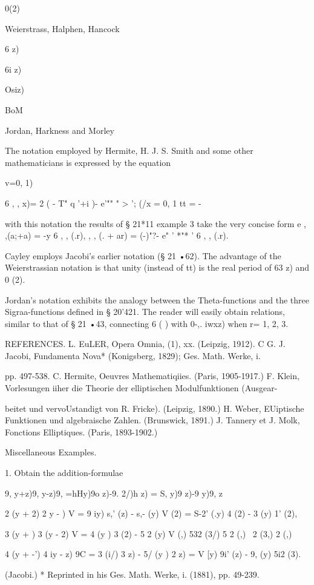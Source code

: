  0(2)

Weierstrass, Halphen, Hancock

6 z)

6i z)

Osiz)

BoM

Jordan, Harkness and Morley

The notation employed by Hermite, H. J. S. Smith and some other
mathematicians is expressed by the equation

v=0, 1)

6 , , x)= 2 ( - T" q '+i )- e'"" " > '; (/x = 0, 1 tt = -

with this notation the results of § 21*11 example 3 take the very
concise form e , ,(a;+a) = -y 6 , , (.r), , , (. + ar) = (-)"?- e" '
*"* ' 6 , , (.r).

Cayley employs Jacobi's earlier notation (§ 21 •62). The advantage of
the Weierstrassian notation is that unity (instead of tt) is the real
period of 63 z) and 0 (2).

Jordan's notation exhibits the analogy between the Theta-functions and
the three Sigraa-functions defined in § 20'421. The reader will easily
obtain relations, similar to that of § 21 •43, connecting 6 ( ) with
0-,. iwxz) when r= 1, 2, 3.

REFERENCES. L. EuLER, Opera Omnia, (1), xx. (Leipzig, 1912). C G. J.
Jacobi, Fundamenta Nova* (Konigsberg, 1829); Ges. Math. Werke, i.

pp. 497-538. C. Hermite, Oeuvres Mathematiqiies. (Paris, 1905-1917.)
F. Klein, Vorlesungen iiher die Theorie der elliptischen
Modulfunktionen (Ausgear-

beitet und vervoUstandigt von R. Fricke). (Leipzig, 1890.) H. Weber,
EUiptische Funktionen und algebraische Zahlen. (Brunswick, 1891.) J.
Tannery et J. Molk, Fonctions Elliptiques. (Paris, 1893-1902.)

Miscellaneous Examples.

1. Obtain the addition-formulae

9, y+z)9, y-z)9, =hHy)9o z)-9. 2/)h z) = S, y)9 z)-9 y)9, z\

 2 (y + 2) 2 y - ) V = 9 iy) s,' (z) - s,- (y) V (2) = S-2' (.y) 4 (2)
- 3 (y) 1' (2),

 3 (y + ) 3 (y - 2) V = 4 (y ) 3 (2) - 5 2 (y) V (,) 532 (3/) 5 2 (,)
\ 2 (3,) 2 (,)

 4 (y + -') 4 iy - z) 9C = 3 (i/) 3 z) - 5/ (y ) 2 z) = V [y) 9i' (z)
- 9, (y) 5i2 (3).

(Jacobi.) * Reprinted in his Ges. Math. Werke, i. (1881), pp. 49-239.

